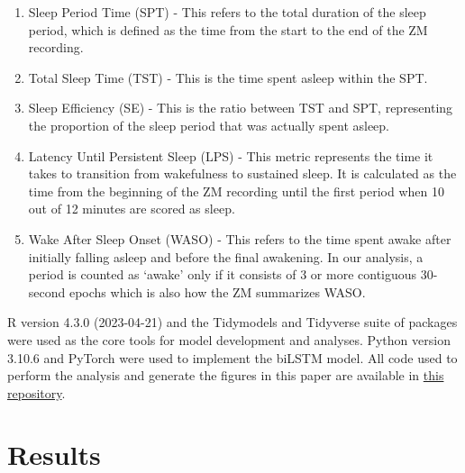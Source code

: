 \documentclass[
  super,
  preprint,
  3p]{elsarticle}
\begin{document}
\begin{enumerate}
\def\labelenumi{\arabic{enumi}.}
\item
  Sleep Period Time (SPT) - This refers to the total duration of the
  sleep period, which is defined as the time from the start to the end
  of the ZM recording.
\item
  Total Sleep Time (TST) - This is the time spent asleep within the SPT.
\item
  Sleep Efficiency (SE) - This is the ratio between TST and SPT,
  representing the proportion of the sleep period that was actually
  spent asleep.
\item
  Latency Until Persistent Sleep (LPS) - This metric represents the time
  it takes to transition from wakefulness to sustained sleep. It is
  calculated as the time from the beginning of the ZM recording until
  the first period when 10 out of 12 minutes are scored as sleep.
\item
  Wake After Sleep Onset (WASO) - This refers to the time spent awake
  after initially falling asleep and before the final awakening. In our
  analysis, a period is counted as `awake' only if it consists of 3 or
  more contiguous 30-second epochs which is also how the ZM summarizes
  WASO.
\end{enumerate}

R version 4.3.0 (2023-04-21)\citep{R-lang} and the
Tidymodels\citep{tidymodels} and Tidyverse\citep{tidyverse} suite of
packages were used as the core tools for model development and analyses.
Python version 3.10.6\citep{10.5555/1593511} and
PyTorch\citep{NEURIPS2019_9015} were used to implement the biLSTM model.
All code used to perform the analysis and generate the figures in this
paper are available in
\href{https://github.com/esbenlykke/sleep_study}{this repository}.

\hypertarget{results}{%
\section{Results}\label{results}}
\end{document}
